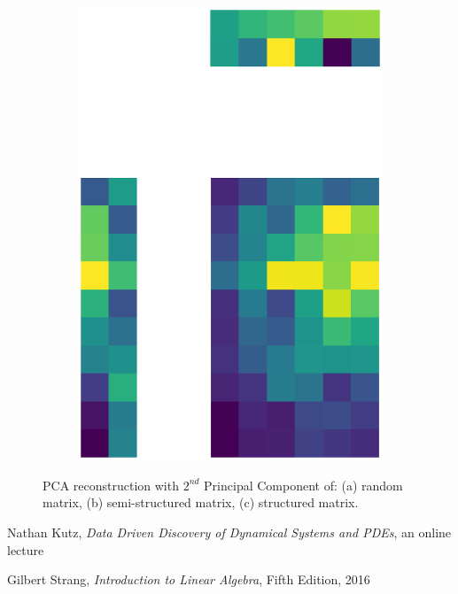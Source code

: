 \documentclass[10pt,twocolumn]{article}
\begin{document}
\begin{figure}[H]
\begin{subfigure}[t]{.15\textwidth}
\includegraphics[scale=.2]{DWGs/structured-matrix-reconstruction-PCs-2.eps}
\caption{ }
\end{subfigure}
\caption{PCA reconstruction with $2^{nd}$ Principal Component of: (a) random matrix, (b) semi-structured matrix, (c) structured matrix.}
\label{fig:matrices-reconstruction}
\end{figure}




\thebibliography{}

 Nathan Kutz, \textit{Data Driven Discovery of Dynamical Systems and PDEs}, an online lecture 

 Gilbert Strang, \textit{Introduction to Linear Algebra}, Fifth Edition, 2016

 \label{bib:pope}
\end{document}
